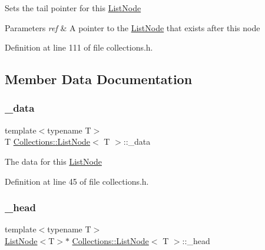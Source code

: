 Sets the tail pointer for this \hyperlink{class_collections_1_1_list_node}{List\+Node} 
\begin{DoxyParams}{Parameters}
{\em ref} & A pointer to the \hyperlink{class_collections_1_1_list_node}{List\+Node} that exists after this node \\
\hline
\end{DoxyParams}


Definition at line 111 of file collections.\+h.



\subsection{Member Data Documentation}
\hypertarget{class_collections_1_1_list_node_a00e5880511d5045370127b2da895ab4f}{}\label{class_collections_1_1_list_node_a00e5880511d5045370127b2da895ab4f} 
\subsubsection{\texorpdfstring{\+\_\+data}{\_data}}
{\footnotesize\ttfamily template$<$typename T$>$ \\
T \hyperlink{class_collections_1_1_list_node}{Collections\+::\+List\+Node}$<$ T $>$\+::\+\_\+data\hspace{0.3cm}{\ttfamily [protected]}}

The data for this \hyperlink{class_collections_1_1_list_node}{List\+Node} 

Definition at line 45 of file collections.\+h.

\hypertarget{class_collections_1_1_list_node_ac40e75e29325a6767686d7e828fa3b6a}{}\label{class_collections_1_1_list_node_ac40e75e29325a6767686d7e828fa3b6a} 
\subsubsection{\texorpdfstring{\+\_\+head}{\_head}}
{\footnotesize\ttfamily template$<$typename T$>$ \\
\hyperlink{class_collections_1_1_list_node}{List\+Node}$<$T$>$$\ast$ \hyperlink{class_collections_1_1_list_node}{Collections\+::\+List\+Node}$<$ T $>$\+::\+\_\+head\hspace{0.3cm}{\ttfamily [protected]}}

